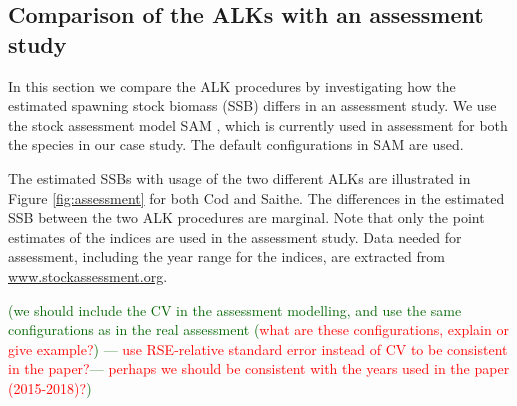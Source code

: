 \documentclass[a4paper 12pt]{article}
\numberwithin{equation}{section}
\newcommand{\ed}[1]{\textcolor{red}{#1}}
\newcommand{\olav}[1]{\textcolor{darkgreen}{#1}}
\begin{document}
\begin{figure}[h!]
\begin{tabular}{@{}ccc@{}}
\end{tabular}
\label{AreaAreaModAllYearsQ1}
\end{figure} 




 \subsection{Comparison of the ALKs with an assessment study}
 In this section we compare the ALK procedures by investigating how the estimated spawning stock biomass (SSB) differs in an assessment study. We use the stock assessment model SAM \citep{nielsen2014estimation}, which is currently used in assessment for both the species in our case study. The default configurations in SAM are used. 
 
The estimated SSBs with usage of the two different ALKs are illustrated in Figure \ref{fig:assessment} for both Cod and Saithe. The differences in the estimated SSB between the two ALK procedures are marginal. Note that only the point estimates of the indices are used in the assessment study. Data needed for assessment, including the year range for the indices, are extracted from \href{www.stockassessment.org}{www.stockassessment.org}.  

\olav{(we should include the CV in the assessment modelling, and use the same configurations as in the real assessment (\ed{what are these configurations, explain or give example?}) --- \ed{use RSE-relative standard error instead of CV to be consistent in the paper?}---  \ed{perhaps we should be consistent with the years used in the paper (2015-2018)?})} 
 
\end{document}
